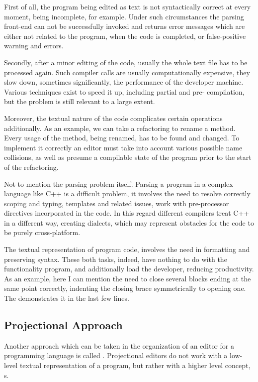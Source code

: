 First of all, the program being edited as text is not syntactically correct at every moment, 
being incomplete, for example. Under such circumstances the parsing front-end can not be
successfully invoked and returns error messages which are either not related to the program, when
the code is completed, or false-positive warning and errors. 

Secondly, after a minor editing of the code, usually the whole text file has to be processed again. Such compiler calls are usually computationally expensive, they slow down, sometimes significantly, the performance of the developer machine. Various techniques exist to speed it up, including partial 
and pre- compilation, but the problem is still relevant to a large extent. 

Moreover, the textual nature of the code complicates certain operations additionally. As an example, we can take a refactoring
to rename a method. Every usage of the method, being renamed, has to be found and changed. To implement it correctly an editor must take into account various possible name collisions, as well 
as presume a compilable state of the program prior to the start of the refactoring.

Not to mention the parsing problem itself. Parsing a program in a complex language like C++ is a difficult problem, it involves 
the need to resolve correctly scoping and typing, templates and related issues, work with pre-processor directives incorporated
in the code. In this regard different compilers treat C++ in a different way, creating dialects, which may represent obstacles for
the code to be purely cross-platform.


The textual representation of program code, involves the need in formatting and preserving syntax. These both tasks, indeed,  have nothing to do with the functionality program, and additionally 
load the developer, reducing productivity. As an example, here I can mention the need to close
several blocks ending at the same point correctly, indenting the closing brace symmetrically 
to opening one. The  demonstrates it in the last few lines.

\subsection{Projectional Approach}

Another approach which can be taken in the organization of an editor for a programming language is called . Projectional editors do not work with a low-level textual representation of a program, but rather with a higher level concept, s.

